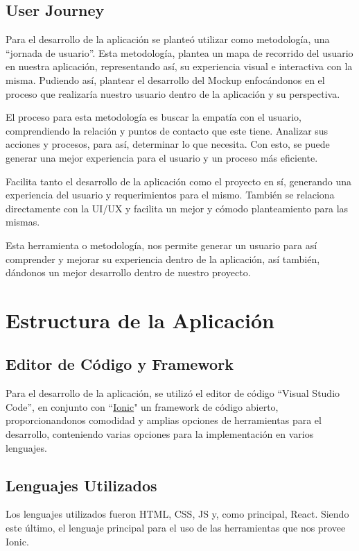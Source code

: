             \subsection{User Journey}
                Para el desarrollo de la aplicación se planteó utilizar como metodología, una “jornada de usuario”. Esta metodología, plantea un mapa de recorrido del usuario en nuestra aplicación, representando así, su experiencia visual e interactiva con la misma. Pudiendo así, plantear el desarrollo del Mockup enfocándonos en el proceso que realizaría nuestro usuario dentro de la aplicación y su perspectiva.\par
                El proceso para esta metodología es buscar la empatía con el usuario, comprendiendo la relación y puntos de contacto que este tiene. Analizar sus acciones y procesos, para así, determinar lo que necesita. Con esto, se puede generar una mejor experiencia para el usuario y un proceso más eficiente.\par
                Facilita tanto el desarrollo de la aplicación como el proyecto en sí, generando una experiencia del usuario y requerimientos para el mismo. También se relaciona directamente con la UI/UX y facilita un mejor y cómodo planteamiento para las mismas.\par
                Esta herramienta o metodología, nos permite generar un usuario para así comprender y mejorar su experiencia dentro de la aplicación, así también, dándonos un mejor desarrollo dentro de nuestro proyecto.\par

                
        \section{Estructura de la Aplicación}
        
            \subsection{Editor de Código y Framework}
                Para el desarrollo de la aplicación, se utilizó el editor de código “Visual Studio Code”, en conjunto con “\href{https://ionicframework.com}{Ionic}" un framework de código abierto, proporcionandonos comodidad y amplias opciones de herramientas para el desarrollo, conteniendo varias opciones para la implementación en varios lenguajes.
                
            \subsection{Lenguajes Utilizados}
                Los lenguajes utilizados fueron HTML, CSS, JS y, como principal, React. Siendo este último, el lenguaje principal para el uso de las herramientas que nos provee Ionic.\par
                
